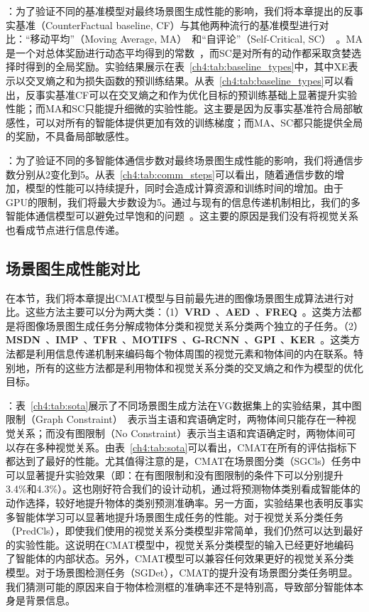 \textbf{}：为了验证不同的基准模型对最终场景图生成性能的影响，我们将本章提出的反事实基准（CounterFactual baseline, CF）与其他两种流行的基准模型进行对比：“移动平均”（Moving Average, MA）~\cite{weaver2013optimal}和“自评论”（Self-Critical, SC）~\cite{rennie2017self}。MA是一个对总体奖励进行动态平均得到的常数~\cite{xu2015show, hu2017learning}，而SC是对所有的动作都采取贪婪选择时得到的全局奖励。实验结果展示在表~\ref{ch4:tab:baseline_types}中，其中XE表示以交叉熵之和为损失函数的预训练结果。从表~\ref{ch4:tab:baseline_types}可以看出，反事实基准CF可以在交叉熵之和作为优化目标的预训练基础上显著提升实验性能；而MA和SC只能提升细微的实验性能。这主要是因为反事实基准符合局部敏感性，可以对所有的智能体提供更加有效的训练梯度；而MA、SC都只能提供全局的奖励，不具备局部敏感性。

\textbf{}：为了验证不同的多智能体通信步数对最终场景图生成性能的影响，我们将通信步数分别从2变化到5。从表~\ref{ch4:tab:comm_steps}可以看出，随着通信步数的增加，模型的性能可以持续提升，同时会造成计算资源和训练时间的增加。由于GPU的限制，我们将最大步数设为5。通过与现有的信息传递机制相比，我们的多智能体通信模型可以避免过早饱和的问题~\cite{dai2017detecting,xu2017scene}。这主要的原因是我们没有将视觉关系也看成节点进行信息传递。


\subsection{场景图生成性能对比}
在本节，我们将本章提出CMAT模型与目前最先进的图像场景图生成算法进行对比。这些方法主要可以分为两大类：（1）\textbf{VRD}~\cite{lu2016visual}、\textbf{AED}~\cite{newell2017pixels}、\textbf{FREQ}~\cite{zellers2018neural}。这类方法都是将图像场景图生成任务分解成物体分类和视觉关系分类两个独立的子任务。（2）\textbf{MSDN}~\cite{li2017scene}、\textbf{IMP}~\cite{xu2017scene}、\textbf{TFR}~\cite{jae2018tensorize}、\textbf{MOTIFS}~\cite{zellers2018neural}、\textbf{G-RCNN}~\cite{yang2018graph}、\textbf{GPI}~\cite{herzig2018mapping}、\textbf{KER}~\cite{chen2019knowledge}。这类方法都是利用信息传递机制来编码每个物体周围的视觉元素和物体间的内在联系。特别地，所有的这些方法都是利用物体和视觉关系分类的交叉熵之和作为模型的优化目标。

\textbf{}：表~\ref{ch4:tab:sota}展示了不同场景图生成方法在VG数据集上的实验结果，其中图限制（Graph Constraint）~\cite{zellers2018neural}表示当主语和宾语确定时，两物体间只能存在一种视觉关系；而没有图限制（No Constraint）表示当主语和宾语确定时，两物体间可以存在多种视觉关系。由表~\ref{ch4:tab:sota}可以看出，CMAT在所有的评估指标下都达到了最好的性能。尤其值得注意的是，CMAT在场景图分类（SGCls）任务中可以显著提升实验效果（即：在有图限制和没有图限制的条件下可以分别提升3.4\%和4.3\%）。这也刚好符合我们的设计动机，通过将预测物体类别看成智能体的动作选择，较好地提升物体的类别预测准确率。另一方面，实验结果也表明反事实多智能体学习可以显著地提升场景图生成任务的性能。对于视觉关系分类任务（PredCls），即使我们使用的视觉关系分类模型非常简单，我们仍然可以达到最好的实验性能。这说明在CMAT模型中，视觉关系分类模型的输入已经更好地编码了智能体的内部状态。另外，CMAT模型可以兼容任何效果更好的视觉关系分类模型。对于场景图检测任务（SGDet），CMAT的提升没有场景图分类任务明显。我们猜测可能的原因来自于物体检测框的准确率还不是特别高，导致部分智能体本身是背景信息。


